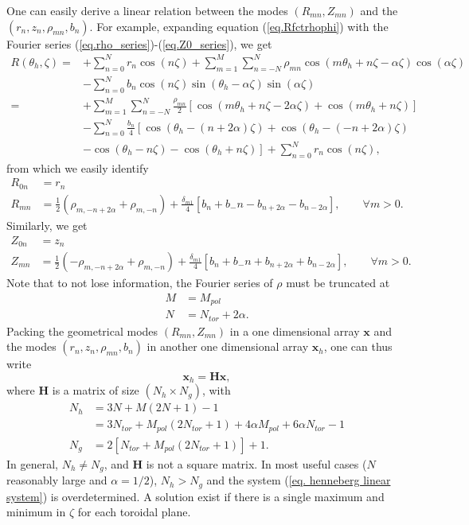\documentclass[my_thesis.tex]{subfiles}
\begin{document}
One can easily derive a linear relation between the modes $(R_{mn},Z_{mn})$ and the $(r_n,z_n,\rho_{mn},b_n)$. For example, expanding equation (\ref{eq.Rfctrhophi}) with the Fourier series (\ref{eq.rho_series})-(\ref{eq.Z0_series}), we get
\begin{align}
	R(\theta_h,\zeta) = &+\sum_{n=0}^Nr_n \cos(n \zeta) + \sum_{m=1}^{M}\sum_{n=-N}^N \rho_{mn}\cos(m\theta_h +n\zeta -\alpha \zeta)\cos(\alpha \zeta)\\
	& - \sum_{n=0}^N b_n\cos(n\zeta)\sin(\theta_h-\alpha \zeta)\sin(\alpha \zeta)\\
	=&+\sum_{m=1}^{M}\sum_{n=-N}^N \frac{\rho_{mn}}{2}\left[\cos(m\theta_h +n\zeta -2\alpha \zeta)+\cos(m\theta_h+n\zeta)\right]\\
	&- \sum_{n=0}^N \frac{b_n}{4}\left[\cos(\theta_h-(n+2\alpha)\zeta)+\cos(\theta_h-(-n+2\alpha)\zeta)\right.\\
	&\left.-\cos(\theta_h-n\zeta)-\cos(\theta_h+n\zeta)\right] +  \sum_{n=0}^Nr_n \cos(n \zeta),
\end{align}
from which we easily identify
\begin{align}
	R_{0n} &= r_n\\
	R_{mn} &= \frac{1}{2}(\rho_{m,-n+2\alpha}+\rho_{m,-n}) + \frac{\delta_{m1}}{4}\left[b_n+b_-n-b_{n+2\alpha}-b_{n-2\alpha}\right], \qquad \forall m>0. \label{eq, linear relation Rmn}
\end{align}
Similarly, we get
\begin{align}
	Z_{0n} &= z_n\\
	Z_{mn} &= \frac{1}{2}(-\rho_{m,-n+2\alpha}+\rho_{m,-n}) + \frac{\delta_{m1}}{4}\left[b_n+b_-n+b_{n+2\alpha}+b_{n-2\alpha}\right], \qquad \forall m>0.	\label{eq, linear relation Zmn}
\end{align}
Note that to not lose information, the Fourier series of $\rho$ must be truncated at 
\begin{align}
M&=M_{pol} \label{eq.truncation rho mpol}\\
N&=N_{tor}+2\alpha. \label{eq.truncation rho ntor}
\end{align}
Packing the geometrical modes $(R_{mn},Z_{mn})$ in a one dimensional array $\mathbf{x}$ and the modes $(r_n,z_n,\rho_{mn},b_n)$ in another one dimensional array $\mathbf{x}_h$, one can thus write
\begin{equation}
	\mathbf{x}_h = \mathbf{H}\mathbf{x}, \label{eq. henneberg linear system}
\end{equation}
where $\mathbf{H}$ is a matrix of size $(N_h\times N_g)$, with
\begin{align}
	N_h &= 3N + M(2N+1) -1 \\
	&= 3N_{tor} + M_{pol}(2N_{tor}+1) + 4\alpha M_{pol} + 6\alpha N_{tor} -1\\
	N_g & = 2[N_{tor}+M_{pol}(2N_{tor}+1)]+1.
\end{align}
In general, $N_h \neq N_g$, and $\mathbf{H}$ is not a square matrix. In most useful cases ($N$ reasonably large and $\alpha=1/2$), $N_h>N_g$ and the system (\ref{eq. henneberg linear system}) is overdetermined. A solution exist if there is a single maximum and minimum in $\zeta$ for each toroidal plane.
\end{document}
